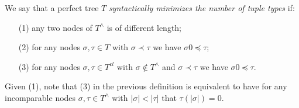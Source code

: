 \begin{definition} \label{def:syntactic_minimize}
We say that a perfect tree $T$ \emph{syntactically minimizes the number of tuple types} if:
\begin{enumerate}
\item[(1)] any two nodes of $T^{\wedge}$ is of different length;
\item[(2)] for any nodes $\sigma,\tau \in T$ with $\sigma \prec \tau$ we have $\sigma 0 \preceq \tau$;
\item[(3)] for any nodes $\sigma,\tau \in T^{cl}$ with $\sigma \notin T^{\wedge}$ and $\sigma \prec \tau$ we have $\sigma 0 \preceq \tau$.
\end{enumerate}
\end{definition}

Given (1), note that (3) in the previous definition is equivalent to have for any incomparable nodes $\sigma,\tau \in T^{\wedge}$ with $|\sigma| < |\tau|$ that $\tau(|\sigma|) = 0$.

